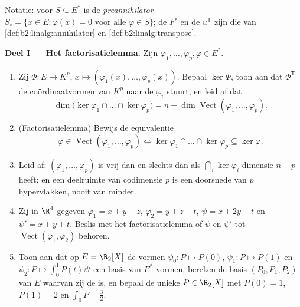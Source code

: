 \begin{problem}
\label{pb:b2:linalg:1}
Notatie: voor $S \subseteq E^*$ is de \emph{preannihilator} $S_\circ
= \{x \in E : \varphi(x) = 0 \text{ voor alle } \varphi \in S\}$;
de  $F^\circ$ en de  $u^{\mathsf T}$
zijn die van \cref{def:b2:linalg:annihilator} en
\cref{def:b2:linalg:transpose}.

\medskip
\noindent\textbf{Deel I --- Het factorisatielemma.} Zijn
$\varphi_1, \dots, \varphi_p, \varphi \in E^*$.
\begin{enumerate}
  \item Zij $\Phi \colon E \to K^p$, $x \mapsto (\varphi_1(x),
        \dots, \varphi_p(x))$. Bepaal $\ker\Phi$, toon aan dat
        $\Phi^{\mathsf T}$ de coördinaatvormen van $K^p$ naar de
        $\varphi_i$ stuurt, en leid af dat
        \[
        \dim \bigl(\ker\varphi_1 \cap \dots \cap
        \ker\varphi_p\bigr) = n - \dim
        \operatorname{Vect}(\varphi_1, \dots, \varphi_p).
        \]
  \item (Factorisatielemma) Bewijs de equivalentie
        \[
        \varphi \in \operatorname{Vect}(\varphi_1, \dots,
        \varphi_p)
        \iff
        \ker\varphi_1 \cap \dots \cap \ker\varphi_p \subseteq
        \ker\varphi .
        \]
  \item Leid af: $(\varphi_1, \dots, \varphi_p)$ is vrij dan en
        slechts dan als $\bigcap_i \ker\varphi_i$ dimensie $n - p$
        heeft; en een deelruimte van codimensie $p$ is een
        doorsnede van $p$ hypervlakken, nooit van minder.
  \item Zij in $\R^4$ gegeven $\varphi_1 = x + y - z$, $\varphi_2 =
        y + z - t$, $\psi = x + 2y - t$ en $\psi' = x + y + t$.
        Beslis met het factorisatielemma of $\psi$ en $\psi'$ tot
        $\operatorname{Vect}(\varphi_1, \varphi_2)$ behoren.
  \item Toon aan dat op $E = \R_2[X]$ de vormen $\psi_0 \colon P
        \mapsto P(0)$, $\psi_1 \colon P \mapsto P(1)$ en $\psi_2
        \colon P \mapsto \int_0^1 P(t)\dd t$ een basis van $E^*$
        vormen, bereken de basis $(P_0, P_1, P_2)$ van $E$ waarvan
        zij de  is, en bepaal de unieke $P \in \R_2[X]$ met
        $P(0) = 1$, $P(1) = 2$ en $\int_0^1 P = \frac32$.
\end{enumerate}


\end{problem}
